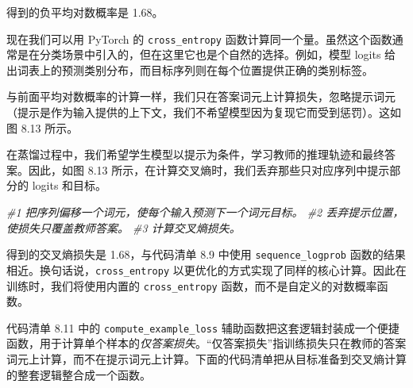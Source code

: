 得到的负平均对数概率是 1.68。

现在我们可以用 PyTorch 的 \texttt{cross\_entropy} 函数计算同一个量。虽然这个函数通常是在分类场景中引入的，但在这里它也是个自然的选择。例如，模型 logits 给出词表上的预测类别分布，而目标序列则在每个位置提供正确的类别标签。

与前面平均对数概率的计算一样，我们只在答案词元上计算损失，忽略提示词元（提示是作为输入提供的上下文，我们不希望模型因为复现它而受到惩罚）。这如图 8.13 所示。


在蒸馏过程中，我们希望学生模型以提示为条件，学习教师的推理轨迹和最终答案。因此，如图 8.13 所示，在计算交叉熵时，我们丢弃那些只对应序列中提示部分的 logits 和目标。

{\noindent\small\textit{\#1 把序列偏移一个词元，使每个输入预测下一个词元目标。 \newline \#2 丢弃提示位置，使损失只覆盖教师答案。 \newline \#3 计算交叉熵损失。}\par}

得到的交叉熵损失是 1.68，与代码清单 8.9 中使用 \texttt{sequence\_logprob} 函数的结果相近。换句话说，\texttt{cross\_entropy} 以更优化的方式实现了同样的核心计算。因此在训练时，我们将使用内置的 \texttt{cross\_entropy} 函数，而不是自定义的对数概率函数。

代码清单 8.11 中的 \texttt{compute\_example\_loss} 辅助函数把这套逻辑封装成一个便捷函数，用于计算单个样本的\emph{仅答案损失}。“仅答案损失”指训练损失只在教师的答案词元上计算，而不在提示词元上计算。下面的代码清单把从目标准备到交叉熵计算的整套逻辑整合成一个函数。

